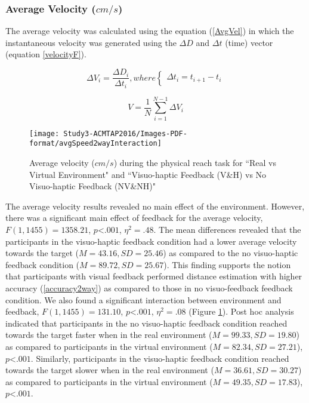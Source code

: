 \subsubsection{Average Velocity ($cm/s$)}
The average velocity was calculated using the equation (\ref{AvgVel}) in which the instantaneous velocity was generated using the $\Delta D$ and $\Delta t$ (time) vector (equation \ref{velocityF}).

\begin{equation} \label{velocityF}
\Delta V_i = \frac{\Delta D_i}{\Delta t_i}, where
\begin{cases}
\Delta t_i = t_{i+1}-t_{i}
\end{cases}
\end{equation}

\begin{equation} \label{AvgVel}
V = \frac{1}{N}\sum_{i=1}^{N-1}\Delta V_i 
\end{equation}

\begin{figure}
	\centering
	\texttt{[image: Study3-ACMTAP2016/Images-PDF-format/avgSpeed2wayInteraction]}
	\caption{Average velocity ($cm/s$) during the physical reach task for ``Real vs Virtual Environment" and ``Visuo-haptic Feedback (V\&H) vs No Visuo-haptic Feedback (NV\&NH)"}
	\label{fig:avgVel2way}
\end{figure}

The average velocity results revealed no main effect of the environment. However, there was a significant main effect of feedback for the average velocity, $F(1,1455)=1358.21$, $p$\textless$.001$, $\eta^{2}=.48$. The mean differences revealed that the participants in the visuo-haptic feedback condition had a lower average velocity towards the target ($M=43.16, SD=25.46$) as compared to the no visuo-haptic feedback condition ($M=89.72, SD=25.67$). This finding supports the notion that participants with visual feedback performed distance estimation with higher accuracy (\ref{accuracy2way}) as compared to those in no visuo-feedback feedback condition. We also found a significant interaction between environment and feedback, $F(1,1455)=131.10$, $p$\textless$.001$, $\eta^{2}=.08$ (Figure \ref{fig:avgVel2way}). Post hoc analysis indicated that participants in the no visuo-haptic feedback condition reached towards the target faster when in the real environment ($M=99.33, SD=19.80$) as compared to participants in the virtual environment ($M=82.34, SD=27.21$), $p$\textless$.001$. Similarly, participants in the visuo-haptic feedback condition reached towards the target slower when in the real environment ($M=36.61, SD=30.27$) as compared to participants in the virtual environment ($M=49.35, SD=17.83$), $p$\textless$.001$. 

